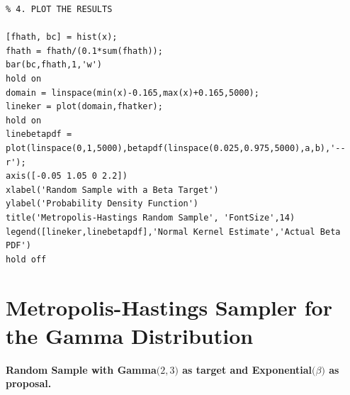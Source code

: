 \documentclass[12pt,a4paper]{article}
\begin{document}
\begin{verbatim}
% 4. PLOT THE RESULTS

[fhath, bc] = hist(x);
fhath = fhath/(0.1*sum(fhath));
bar(bc,fhath,1,'w')
hold on
domain = linspace(min(x)-0.165,max(x)+0.165,5000);
lineker = plot(domain,fhatker);
hold on
linebetapdf = plot(linspace(0,1,5000),betapdf(linspace(0.025,0.975,5000),a,b),'--r');
axis([-0.05 1.05 0 2.2])
xlabel('Random Sample with a Beta Target')
ylabel('Probability Density Function')
title('Metropolis-Hastings Random Sample', 'FontSize',14)
legend([lineker,linebetapdf],'Normal Kernel Estimate','Actual Beta PDF')
hold off
\end{verbatim}
\clearpage

\section*{Metropolis-Hastings Sampler for the Gamma Distribution}
\textbf{Random Sample with Gamma$\bigr(2,3)$ as target and Exponential$\bigr(\beta\bigr)$ as proposal.}
\end{document}
